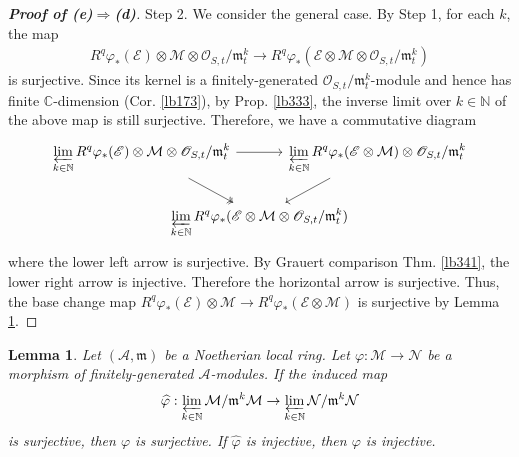 \documentclass[12pt,b5paper,notitlepage]{report}
\theoremstyle{definition}
\theoremstyle{plain}
\newtheorem{lm}[df]{Lemma}
\newcommand{\mc}{\mathcal}
\newcommand{\wht}{\widehat}
\newcommand{\scr}{\mathscr}
\newcommand{\Cbb}{\mathbb C}
\newcommand{\Nbb}{\mathbb N}
\newcommand{\mk}{\mathfrak m}
\numberwithin{equation}{section}
\begin{document}
\begin{proof}[\textbf{Proof of (e)$\Rightarrow$(d)}]
Step 2. We consider the general case. By Step 1, for each $k$, the map
\begin{align*}
R^q\varphi_*(\scr E)\otimes\mc M \otimes\scr O_{S,t}/\mk_t^k\rightarrow R^q\varphi_*(\scr E\otimes\mc M \otimes\scr O_{S,t}/\mk_t^k)
\end{align*}
is surjective. Since its kernel is a finitely-generated $\scr O_{S,t}/\mk_t^k$-module and hence has finite $\Cbb$-dimension (Cor. \ref{lb173}), by Prop. \ref{lb333}, the inverse limit over $k\in\Nbb$ of the above map is still surjective. Therefore, we have a commutative diagram
\begin{equation*}
\begin{tikzcd}[column sep=-1.8cm]
\displaystyle\varprojlim_{k\in\Nbb} R^q\varphi_*(\scr E)\otimes\mc M\otimes\scr O_{S,t}/\mk_t^k \arrow[rr] \arrow[rd, two heads] &              & \displaystyle\varprojlim_{k\in\Nbb} R^q\varphi_*(\scr E\otimes\mc M)\otimes\scr O_{S,t}/\mk_t^k \\
                        & \displaystyle\varprojlim_{k\in\Nbb} R^q\varphi_*(\scr E\otimes\mc M\otimes\scr O_{S,t}/\mk_t^k) \arrow[from=ru] &  
\end{tikzcd}
\end{equation*}
where the lower left arrow is surjective. By Grauert comparison Thm. \ref{lb341}, the lower right arrow is injective. Therefore the horizontal arrow is surjective. Thus, the base change map $R^q\varphi_*(\scr E)\otimes\mc M\rightarrow R^q\varphi_*(\scr E\otimes\mc M)$ is surjective by Lemma \ref{lb342}.
\end{proof}



\begin{lm}\label{lb342}
Let $(\mc A,\mk)$ be a Noetherian local ring. Let $\varphi:\mc M\rightarrow\mc N$ be a morphism of finitely-generated $\mc A$-modules. If the induced map
\begin{align*}
\wht\varphi:\varprojlim_{k\in\Nbb} \mc M/\mk^k\mc M \rightarrow \varprojlim_{k\in\Nbb} \mc N/\mk^k\mc N
\end{align*}
is surjective, then $\varphi$ is surjective. If $\wht\varphi$ is injective, then $\varphi$ is injective.
\end{lm}
\end{document}
